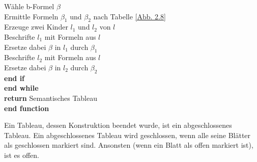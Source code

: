 \begin{tabbing}
\>\>\> Wähle b-Formel $\beta$\\
\>\>\> Ermittle Formeln $\beta_1$ und $\beta_2$ nach Tabelle \ref{Abb. 2.8}\\
\>\>\> Erzeuge zwei Kinder $l_1$ und $l_2$ von $l$\\
\>\>\> Beschrifte $l_1$ mit Formeln aus $l$\\
\>\>\> Ersetze dabei $\beta$ in $l_1$ durch $\beta_1$\\
\>\>\> Beschrifte $l_2$ mit Formeln aus $l$\\
\>\>\> Ersetze dabei $\beta$ in $l_2$ durch $\beta_2$\\
\>\> \textbf{end if} \\
\> \textbf{end while} \\
\> \textbf{return}  Semantisches Tableau\\
\textbf{end function} \\
\end{tabbing} 

\begin{defi} \label{Definition 2.65} \end{defi} Ein Tableau, dessen Konstruktion beendet wurde, ist ein abgeschlossenes Tableau. Ein abgeschlossenes Tableau wird geschlossen, wenn alle seine Blätter als geschlossen markiert sind. Ansonsten (wenn ein Blatt als offen markiert ist), ist es offen.